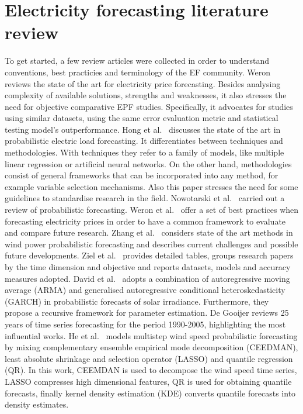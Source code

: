 \section{Electricity forecasting literature review}
To get started, a few review articles were collected in order to understand conventions, best practicies and terminology of the EF community.
Weron \cite{EPF_review} reviews the state of the art for electricity price forecasting. Besides analysing complexity of available solutions, strengths and weaknesses, it also stresses the need for objective comparative EPF studies. Specifically, it advocates for studies using similar datasets, using the same error evaluation metric and statistical testing model's outperformance.
Hong et al.\ \cite{prob_elf} discusses the state of the art in probabilistic electric load forecasting. It differentiates between techniques and methodologies. With techniques they refer to a family of models, like multiple linear regression or artificial neural networks. On the other hand, methodologies consist of general frameworks that can be incorporated into any method, for example variable selection mechanisms. Also this paper stresses the need for some guidelines to standardise research in the field.
Nowotarski et al.\ \cite{nowotarski} carried out a review of probabilistic forecasting.
Weron et al.\ \cite{lago} offer a set of best practices when forecasting electricity prices in order to have a common framework to evaluate and compare future research.
Zhang et al.\ \cite{zhang2014review} considers state of the art methods in wind power probabilistic forecasting and describes current challenges and possible future developments.
Ziel et al.\ \cite{ziel2018probabilistic} provides detailed tables, groups research papers by the time dimension and objective and reports datasets, models and accuracy 
measures adopted.
David et al.\ \cite{david2016probabilistic} adopts a combination of autoregressive moving average (ARMA) and generalised autoregressive conditional heteroskedasticity (GARCH) in probabilistic forecasts of solar irradiance. Furthermore, they propose a recursive framework for parameter estimation.
De Gooijer \cite{de200625} reviews 25 years of time series forecasting for the period 1990-2005, highlighting the most influential works.
He et al.\ \cite{he2022cooperative} models multistep wind speed probabilistic forecasting by mixing complementary ensemble empirical mode decomposition (CEEDMAN), least absolute shrinkage and selection operator (LASSO) and quantile regression (QR). In this work, CEEMDAN is used to decompose the wind speed time series, LASSO compresses high dimensional features, QR is used for obtaining quantile forecasts, finally kernel density estimation (KDE) converts quantile forecasts into density estimates.
